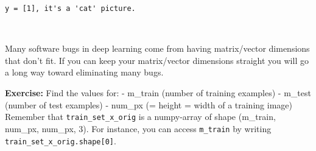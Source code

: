 \documentclass[11pt]{article}
\begin{document}
    \begin{Verbatim}[commandchars=\\\{\}]
y = [1], it's a 'cat' picture.

    \end{Verbatim}

    \begin{center}
    \end{center}
    { \hspace*{\fill} \\}
    
    Many software bugs in deep learning come from having matrix/vector
dimensions that don't fit. If you can keep your matrix/vector dimensions
straight you will go a long way toward eliminating many bugs.

\textbf{Exercise:} Find the values for: - m\_train (number of training
examples) - m\_test (number of test examples) - num\_px (= height =
width of a training image) Remember that \texttt{train\_set\_x\_orig} is
a numpy-array of shape (m\_train, num\_px, num\_px, 3). For instance,
you can access \texttt{m\_train} by writing
\texttt{train\_set\_x\_orig.shape{[}0{]}}.
\end{document}
